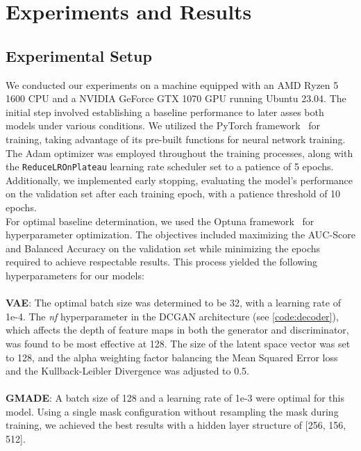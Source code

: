 \cleardoubleoddpage%
\chapter{Experiments and Results}
\section{Experimental Setup}
We conducted our experiments on a machine equipped with an AMD Ryzen 5 1600 CPU and a NVIDIA GeForce GTX 1070 GPU running Ubuntu 23.04. The initial step involved establishing a baseline performance to later asses both models under various conditions. We utilized the PyTorch framework~\cite{paszke2019pytorch} for training, taking advantage of its pre-built functions for neural network training. The Adam optimizer was employed throughout the training processes, along with the \lstinline{ReduceLROnPlateau} learning rate scheduler set to a patience of 5 epochs. Additionally, we implemented early stopping, evaluating the model's performance on the validation set after each training epoch, with a patience threshold of 10 epochs.\\
For optimal baseline determination, we used the Optuna framework~\cite{akiba2019optuna} for hyperparameter optimization. The objectives included maximizing the AUC-Score and Balanced Accuracy on the validation set while minimizing the epochs required to achieve respectable results. This process yielded the following hyperparameters for our models:\\\\
\textbf{VAE}: The optimal batch size was determined to be 32, with a learning rate of 1e-4. The \textit{nf} hyperparameter in the DCGAN architecture (see \autoref{code:decoder}), which affects the depth of feature maps in both the generator and discriminator, was found to be most effective at 128. The size of the latent space vector was set to 128, and the alpha weighting factor balancing the Mean Squared Error loss and the Kullback-Leibler Divergence was adjusted to 0.5.\\\\
\textbf{GMADE}: A batch size of 128 and a learning rate of 1e-3 were optimal for this model. Using a single mask configuration without resampling the mask during training, we achieved the best results with a hidden layer structure of [256, 156, 512].
